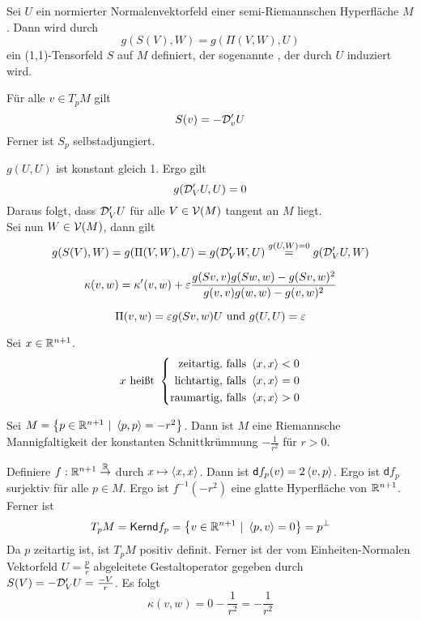 \documentclass{book}
\renewcommand{\i}{^{-1}}
\renewcommand{\d}{\textsf{d}}
\begin{document}
\Def{}
Sei $U$ ein normierter Normalenvektorfeld einer semi-Riemannschen Hyperfläche $M$. Dann wird durch
\[ g(S(V),W)  = g(\Pi(V,W), U)\]
ein (1,1)-Tensorfeld $S$ auf $M$ definiert, der sogenannte , der durch $U$ induziert wird.

\Lem{}
Für alle $v \in T_pM$ gilt
\[ S(v) = -\mathcal{D}'_vU \]
Ferner ist $S_p$ selbstadjungiert.
\begin{Beweis}{}
$g(U,U)$ ist konstant gleich 1. Ergo gilt
\[ g(\mathcal{D}'_VU,U) = 0 \]
Daraus folgt, dass $\mathcal{D}'_VU$ für alle $V \in \mathcal{V}(M)$ tangent an $M$ liegt.\\
Sei nun $W \in \mathcal{V}(M)$, dann gilt
\[ g(S(V),W) = g(\Pi(V,W), U) =g(\mathcal{D}'_VW, U) \overset{g(U,W) = 0}{=} g(\mathcal{D}'_VU,W)   \]
\end{Beweis}

\Kor{}
\[ \kappa(v,w) = \kappa'(v,w) + \varepsilon \frac{g(Sv,v)g(Sw,w) - g(Sv,w)^2}{g(v,v) g(w,w) - g(v,w)^2} \]
\begin{Beweis}{}
\[ \Pi(v,w) = \varepsilon g(Sv,w) U \text{ und } g(U,U) = \varepsilon \]
\end{Beweis}

\newpage
{}
Sei $x \in \mathbb{R}^{n+1}$.
\begin{align*}
x \text{ heißt } \left\lbrace \begin{aligned}
\text{zeitartig, falls } &\left<x,x\right> < 0\\
\text{lichtartig, falls } &\left<x,x\right> = 0\\
\text{raumartig, falls } &\left<x,x\right> > 0
\end{aligned} \right.
\end{align*}

\Prop{}
Sei $M = \set{p \in \R^{n+1}}{\shrp{p,p} = -r^2}$. Dann ist $M$ eine Riemannsche Mannigfaltigkeit der konstanten Schnittkrümmung $-\frac{1}{r^2}$ für $r > 0$.
\begin{Beweis}{}
Definiere $f : \mathbb{R}^{n+1} \overset{\mathbb{R}}{\rightarrow}$ durch $x \mapsto \left<x,x\right>$. Dann ist $\d f_p(v) = 2\shrp{v,p}$. Ergo ist $\d f_p$ surjektiv für alle $p \in M$. Ergo ist $f\i(-r^2)$ eine glatte Hyperfläche von $\mathbb{R}^{n+1}$.\\
Ferner ist
\[ T_pM = \Ker \d f_p  = \set{v \in \R^{n+1}}{\shrp{p,v} = 0} = p^\bot \]
Da $p$ zeitartig ist, ist $T_pM$ positiv definit. Ferner ist der vom Einheiten-Normalen Vektorfeld $U = \frac{p}{r}$ abgeleitete Gestaltoperator gegeben durch $S(V) = - \mathcal{D}'_VU = \frac{-V}{r}$. Es folgt
\[ \kappa(v,w) = 0 - \frac{1}{r^2} = - \frac{1}{r^2} \] 
\end{Beweis}
\end{document}
